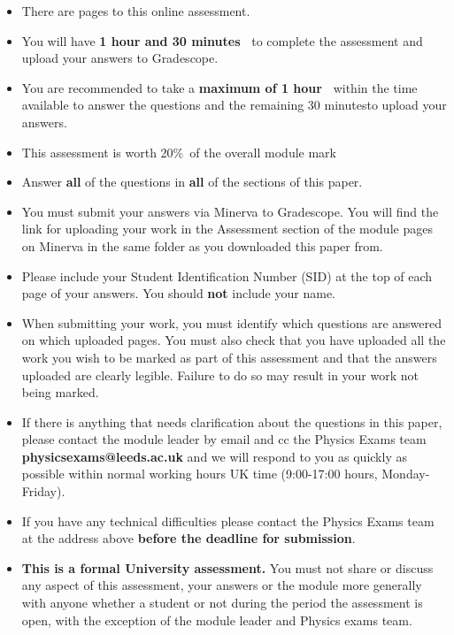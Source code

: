 \documentclass[12pt]{article}
\def\totaltime{1 hour and 30 minutes\ } %
\def\answertime{1 hour\ } %
\def\uploadtime{30 minutes}%
\def\paperweight{20\%\ }
\begin{document}
\begin{itemize}[itemsep=0pt,topsep=0pt]
\item There are \pageref{LastPage} pages to this online assessment.
\item You will have \textbf{\totaltime} to complete the assessment and upload your answers to Gradescope.
\item You are recommended to take a \textbf{maximum of \answertime} within the time available to answer the questions and the remaining \uploadtime to upload your answers. 
\item This assessment is worth \paperweight of the overall module mark
\item Answer \textbf{all} of the questions in \textbf{all} of the sections of this paper.
\item You must submit your answers via Minerva to Gradescope. You will find the link for uploading your work in the Assessment section of the module pages on Minerva in the same folder as you downloaded this paper from.
\item Please include your Student Identification Number (SID) at the top of each page of your answers. You should \textbf{not} include your name.
\item When submitting your work, you must identify which questions are answered on which uploaded pages. You must also check that you have uploaded all the work you wish to be marked as part of this assessment and that the answers uploaded are clearly legible. Failure to do so may result in your work not being marked.
\item If there is anything that needs clarification about the questions in this paper, please contact the module leader by email and cc the Physics Exams team \textbf{physicsexams@leeds.ac.uk} and we will respond to you as quickly as possible within normal working hours UK time (9:00-17:00 hours, Monday-Friday). 
\item If you have any technical difficulties please contact the Physics Exams team at the address above \textbf{before the deadline for submission}.
\item \textbf{This is a formal University assessment.} You must not share or discuss any aspect of this assessment, your answers or the module more generally with anyone whether a student or not during the period the assessment is open, with the exception of the module leader and Physics exams team.
\end{itemize}	
	
\end{document}

